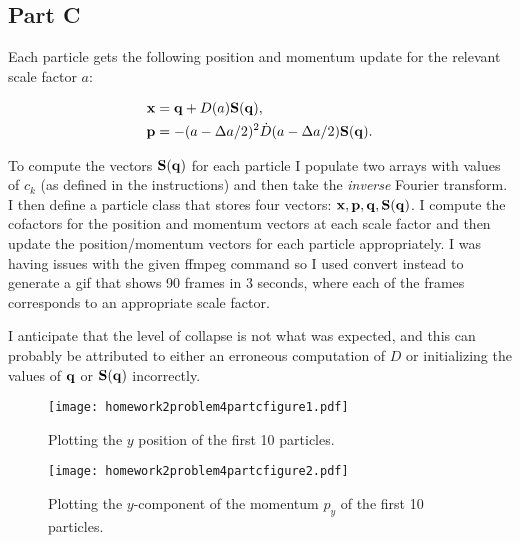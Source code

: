 \subsection*{Part C}

Each particle gets the following position and momentum update for the relevant scale factor $a$:

\begin{align}
\mathbf{x} &= \mathbf{q} + D(a) \mathbf{S}(\mathbf{q}), \\
\mathbf{p} &= -(a-\Delta a /2)^{2}\dot{D}(a-\Delta a/2) \mathbf{S}(\mathbf{q}).
\end{align}

To compute the vectors $\mathbf{S}(\mathbf{q})$ for each particle I populate two arrays with values of $c_{k}$ (as defined in the instructions) and then take the \textit{inverse} Fourier transform. I then define a particle class that stores four vectors: $\mathbf{x}, \mathbf{p}, \mathbf{q}, \mathbf{S}(\mathbf{q})$. I compute the cofactors for the position and momentum vectors at each scale factor and then update the position/momentum vectors for each particle appropriately. I was having issues with the given ffmpeg command so I used convert instead to generate a gif that shows 90 frames in 3 seconds, where each of the frames corresponds to an appropriate scale factor.

I anticipate that the level of collapse is not what was expected, and this can probably be attributed to either an erroneous computation of $D$ or initializing the values of $\mathbf{q}$ or $\mathbf{S}(\mathbf{q})$ incorrectly.



\clearpage

\begin{figure}[h]
    \centering
    \texttt{[image: homework2problem4partcfigure1.pdf]}
    \caption{Plotting the $y$ position of the first 10 particles.}
    \label{fig:24c1}
\end{figure}

\begin{figure}[h]
    \centering
    \texttt{[image: homework2problem4partcfigure2.pdf]}
    \caption{Plotting the $y$-component of the momentum $p_{y}$ of the first 10 particles.}
    \label{fig:24c2}
\end{figure}

\clearpage
